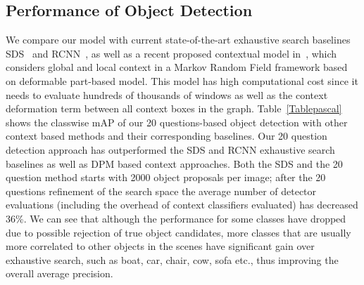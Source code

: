 
\subsection{Performance of Object Detection} We compare our model with current state-of-the-art exhaustive search baselines SDS~\cite{BharathECCV2014} and RCNN~\cite{girshick14CVPR}, as well as  a recent proposed contextual model in~\cite{mottaghi2014role}, which considers global and local context in a Markov Random Field framework based on deformable part-based model. This model has high computational cost since it needs to evaluate hundreds of thousands of windows as well as the context deformation term between all context boxes in the graph. Table~\ref{Tablepascal} shows the classwise mAP of our 20 questions-based object detection with other context based methods and their corresponding baselines.  Our 20 question detection approach has outperformed the SDS and RCNN exhaustive search baselines as well as DPM based context approaches. Both the SDS and the 20 question method starts with 2000 object proposals per image; after the 20 questions refinement of the search space the average number of detector evaluations (including the overhead of context classifiers evaluated) has decreased 36\%. We can see that although the performance for some classes have dropped due to possible rejection of true object candidates, more classes that are usually more correlated  to other objects in the scenes have significant gain over exhaustive search, such as boat, car, chair, cow, sofa etc., thus improving the overall average precision. 


